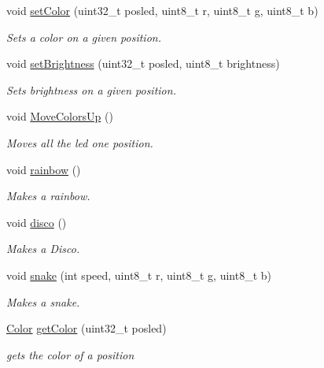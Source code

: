 \begin{DoxyCompactItemize}
void \hyperlink{class_l_e_dstrip_abccaa5762ec0a8cc6ff1de17d709cf96}{set\+Color} (uint32\+\_\+t posled, uint8\+\_\+t r, uint8\+\_\+t g, uint8\+\_\+t b)
\begin{DoxyCompactList}\small\item\em Sets a color on a given position. \end{DoxyCompactList}\item 
void \hyperlink{class_l_e_dstrip_a75c168fb81979cfa453f8fa5f758bfac}{set\+Brightness} (uint32\+\_\+t posled, uint8\+\_\+t brightness)
\begin{DoxyCompactList}\small\item\em Sets brightness on a given position. \end{DoxyCompactList}\item 
void \hyperlink{class_l_e_dstrip_af18580ebff4512a764f968771f87bcb6}{Move\+Colors\+Up} ()
\begin{DoxyCompactList}\small\item\em Moves all the led one position. \end{DoxyCompactList}\item 
void \hyperlink{class_l_e_dstrip_af55f0cd37fa12d3c06c1c3b6097760f8}{rainbow} ()
\begin{DoxyCompactList}\small\item\em Makes a rainbow. \end{DoxyCompactList}\item 
void \hyperlink{class_l_e_dstrip_a586a43486166d3f867d50fc4e8c549ca}{disco} ()
\begin{DoxyCompactList}\small\item\em Makes a Disco. \end{DoxyCompactList}\item 
void \hyperlink{class_l_e_dstrip_a21a402a28f249ad5eba81712d3498af6}{snake} (int speed, uint8\+\_\+t r, uint8\+\_\+t g, uint8\+\_\+t b)
\begin{DoxyCompactList}\small\item\em Makes a snake. \end{DoxyCompactList}\item 
\hyperlink{struct_color}{Color} \hyperlink{class_l_e_dstrip_ab72d203e4a58842eb6fb985145895312}{get\+Color} (uint32\+\_\+t posled)
\begin{DoxyCompactList}\small\item\em gets the color of a position \end{DoxyCompactList}\end{DoxyCompactItemize}


